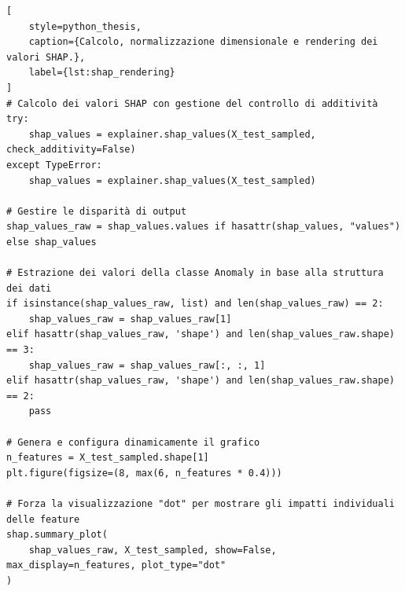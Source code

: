 \begin{lstlisting}[
    style=python_thesis,
    caption={Calcolo, normalizzazione dimensionale e rendering dei valori SHAP.},
    label={lst:shap_rendering}
]
# Calcolo dei valori SHAP con gestione del controllo di additività
try:
    shap_values = explainer.shap_values(X_test_sampled, check_additivity=False)
except TypeError:
    shap_values = explainer.shap_values(X_test_sampled)

# Gestire le disparità di output
shap_values_raw = shap_values.values if hasattr(shap_values, "values") else shap_values

# Estrazione dei valori della classe Anomaly in base alla struttura dei dati
if isinstance(shap_values_raw, list) and len(shap_values_raw) == 2:
    shap_values_raw = shap_values_raw[1]
elif hasattr(shap_values_raw, 'shape') and len(shap_values_raw.shape) == 3:
    shap_values_raw = shap_values_raw[:, :, 1]
elif hasattr(shap_values_raw, 'shape') and len(shap_values_raw.shape) == 2:
    pass

# Genera e configura dinamicamente il grafico
n_features = X_test_sampled.shape[1]
plt.figure(figsize=(8, max(6, n_features * 0.4)))

# Forza la visualizzazione "dot" per mostrare gli impatti individuali delle feature
shap.summary_plot(
    shap_values_raw, X_test_sampled, show=False, max_display=n_features, plot_type="dot"
)
\end{lstlisting}